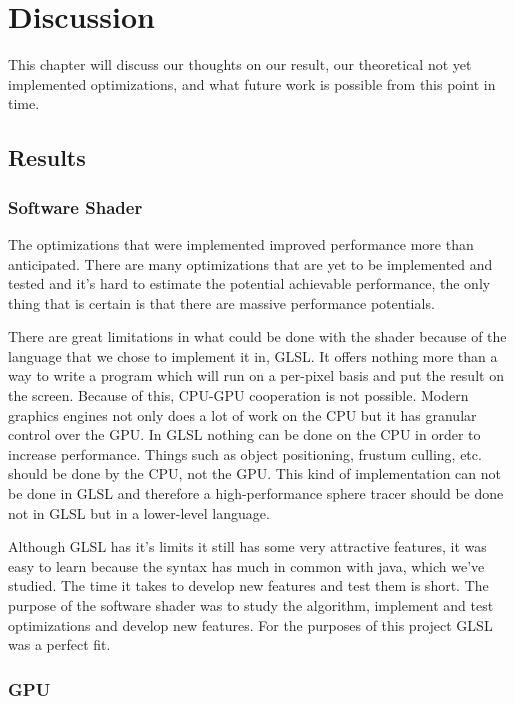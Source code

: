 \chapter{Discussion} 

	This chapter will discuss our thoughts on our result, our theoretical not
	yet	implemented optimizations, and what future work is possible from this
	point in time.
	
	\section{Results}  \label{discussion}
		
		\subsection{Software Shader}
		
			The optimizations that were implemented improved performance more
			than anticipated. There are many optimizations that are yet to be
			implemented and tested and it's hard to estimate the potential
			achievable performance, the only thing that is certain is that
			there are massive performance potentials.

			There are great limitations in what could be done with the shader
			because of the language that we chose to implement it in, GLSL. It
			offers nothing more than a way to write a program which will run on
			a per-pixel basis and put the result on the screen. Because of
			this, CPU-GPU cooperation is not possible. Modern graphics engines 
			not only does a lot of work on the CPU but it has granular control 
			over the GPU. In GLSL nothing can be done on the CPU in order to 
			increase performance. Things such as object positioning, frustum 
			culling, etc. should be done by the CPU, not the GPU. This kind of 
			implementation can not be done in GLSL and therefore a 
			high-performance sphere tracer should be done not in GLSL but in a 
			lower-level language.

			Although GLSL has it's limits it still has some very attractive
			features, it was easy to learn because the syntax has much in
			common with java, which we've studied. The time it takes to develop
			new features and test them is short. The purpose of the software
			shader was to study the algorithm, implement and test optimizations
			and develop new features. For the purposes of this project GLSL was 
			a perfect fit.
		
		\subsection{GPU} 
		
